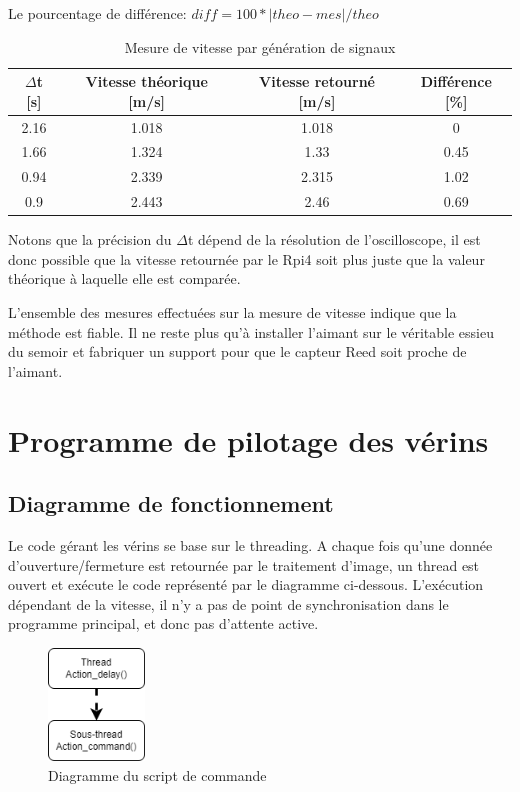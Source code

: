 Le pourcentage de différence: \(diff = 100*|theo-mes|/theo \)
\begin{table}[h]
    \begin{center}
        \caption{Mesure de vitesse par génération de signaux}
        \begin{tabular}{|c|c|c|c|}
            $\Delta$t [s] & Vitesse théorique [m/s] & Vitesse retourné [m/s] & Différence  [\%] \\ \hline
            2.16          & 1.018                   & 1.018                  & 0                \\
            1.66          & 1.324                   & 1.33                   & 0.45             \\
            0.94          & 2.339                   & 2.315                  & 1.02             \\
            0.9           & 2.443                   & 2.46                   & 0.69             \\
        \end{tabular}
    \end{center}
\end{table}

Notons que la précision du $\Delta$t dépend de la résolution de l'oscilloscope, il est donc possible que la vitesse retournée par le Rpi4
soit plus juste que la valeur théorique à laquelle elle est comparée.

L'ensemble des mesures effectuées sur la mesure de vitesse indique que la méthode est fiable. Il ne reste plus qu'à installer l'aimant sur le véritable
essieu du semoir et fabriquer un support pour que le capteur Reed soit proche de l'aimant.
\section{Programme de pilotage des vérins}
\subsection{Diagramme de fonctionnement}
Le code gérant les vérins se base sur le threading. A chaque fois qu'une donnée d'ouverture/fermeture est retournée par le traitement d'image,
un thread est ouvert et exécute le code représenté par le diagramme ci-dessous. L'exécution dépendant de la vitesse, il n'y a pas de point de synchronisation
dans le programme principal, et donc pas d'attente active.

\begin{figure}[H]
    \centering
    \includegraphics[height=3cm]{assets/figures/diag_command.png}
    \caption{Diagramme du script de commande}
\end{figure}

